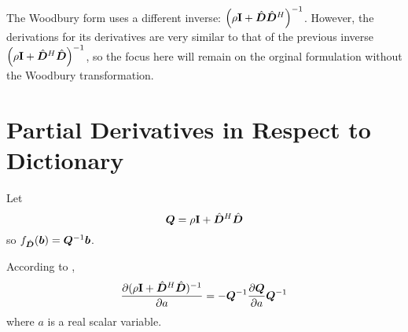 \begin{appendices}
The Woodbury form uses a different inverse: $\left(\rho{\bf I} + \hat{\bm{D}}\hat{\bm{D}}^H\right)^{-1}$. However, the derivations for its derivatives are very similar to that of the previous inverse $\left(\rho{\bf I} + \hat{\bm{D}}^H\hat{\bm{D}}\right)^{-1}$, so the focus here will remain on the orginal formulation without the Woodbury transformation.

\section{Partial Derivatives in Respect to Dictionary} \label{section:Differentiating Standard Form}
Let
%
\begin{equation}
\bm{Q} = \rho{\bf I} + \hat{\bm{D}}^H\hat{\bm{D}}
\end{equation}
%
so $f_{\hat{\bm{D}}}(\bm{b}) = \bm{Q}^{-1}\bm{b}$.

According to \cite{petersen2008matrix},
\begin{equation} \label{equation:Derivative of Inverse}
\frac{\partial (\rho{\bf I} + \hat{\bm{D}}^H\hat{\bm{D}})^{-1}}{\partial a} = -\bm{Q}^{-1}\frac{\partial \bm{Q}}{\partial a}\bm{Q}^{-1}
\end{equation}
where $a$ is a real scalar variable.


\end{appendices}
